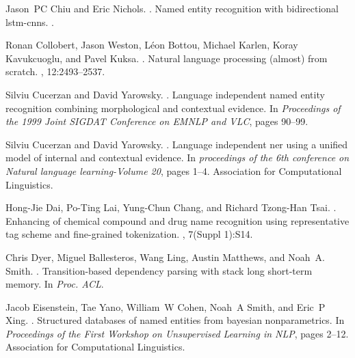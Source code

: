 \documentclass[11pt,letterpaper]{article}
\begin{document}
\begin{thebibliography}{}
Jason~PC Chiu and Eric Nichols.
.
\newblock Named entity recognition with bidirectional lstm-cnns.
.

Ronan Collobert, Jason Weston, L{\'e}on Bottou, Michael Karlen, Koray
  Kavukcuoglu, and Pavel Kuksa.
.
\newblock Natural language processing (almost) from scratch.
, 12:2493--2537.

Silviu Cucerzan and David Yarowsky.
.
\newblock Language independent named entity recognition combining morphological
  and contextual evidence.
\newblock In {\em Proceedings of the 1999 Joint SIGDAT Conference on EMNLP and
  VLC}, pages 90--99.

Silviu Cucerzan and David Yarowsky.
.
\newblock Language independent ner using a unified model of internal and
  contextual evidence.
\newblock In {\em proceedings of the 6th conference on Natural language
  learning-Volume 20}, pages 1--4. Association for Computational Linguistics.

Hong-Jie Dai, Po-Ting Lai, Yung-Chun Chang, and Richard Tzong-Han Tsai.
.
\newblock Enhancing of chemical compound and drug name recognition using
  representative tag scheme and fine-grained tokenization.
, 7(Suppl 1):S14.

Chris Dyer, Miguel Ballesteros, Wang Ling, Austin Matthews, and Noah~A. Smith.
.
\newblock Transition-based dependency parsing with stack long short-term
  memory.
\newblock In {\em Proc. ACL}.

Jacob Eisenstein, Tae Yano, William~W Cohen, Noah~A Smith, and Eric~P Xing.
.
\newblock Structured databases of named entities from bayesian nonparametrics.
\newblock In {\em Proceedings of the First Workshop on Unsupervised Learning in
  NLP}, pages 2--12. Association for Computational Linguistics.


\end{thebibliography}
\end{document}
